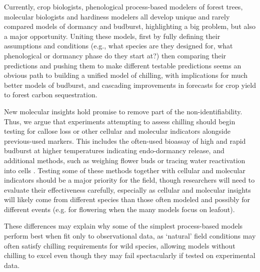 \documentclass[11pt]{article}
\begin{document}
Currently, crop biologists, phenological process-based modelers of forest trees, molecular biologists and hardiness modelers all develop unique and rarely compared models of dormancy and budburst, highlighting a big problem, but also a major opportunity. Uniting these models, first by fully defining their assumptions and conditions (e.g., what species are they designed for, what phenological or dormancy phase do they start at?) then comparing their predictions and pushing them to make different testable predictions seems an obvious path to building a unified model of chilling, with implications for much better models of budburst, and cascading improvements in forecasts for crop yield to forest carbon sequestration. 


New molecular insights hold promise to remove part of the non-identifiability. Thus, we argue that experiments attempting to assess chilling should begin testing for callose loss or other  cellular and molecular indicators alongside previous-used markers. This includes the often-used bioassay of high and rapid budburst at higher temperatures indicating endo-dormancy release, and additional methods, such as weighing flower buds \citep{chuine2016} or tracing water reactivation into cells \citep{faust1991bound,Kalcsits2009}. Testing some of these methods together with cellular and molecular indicators should be a major priority for the field, though researchers will need to evaluate their effectiveness carefully, especially as cellular and molecular insights will likely come from different species than those often modeled and possibly for different events (e.g. for flowering when the many models focus on leafout). %

These differences may explain why some of the simplest process-based models perform best when fit only to observational data, as `natural' field conditions may often satisfy chilling requirements for wild species, allowing models without chilling to excel even though they may fail spectacularly if tested on experimental data. 
\end{document}
